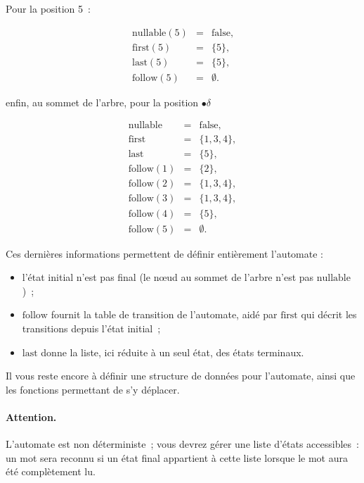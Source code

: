 Pour la position 5~: 

$$\begin{array}{lcl}
\mbox{nullable}(5)&=&\mbox{false},\\
\mbox{first}(5)&=&\{5\},\\
\mbox{last}(5)&=&\{5\},\\
\mbox{follow}(5)&=&\emptyset.
\end{array}
$$


enfin, au sommet de l'arbre, pour la position $\bullet \delta$

$$\begin{array}{lcl}
\mbox{nullable}&=&\mbox{false},\\
\mbox{first}&=&\{1,3,4\},\\
\mbox{last}&=&\{5\},\\
\mbox{follow}(1)&=&\{2\},\\
\mbox{follow}(2)&=&\{1,3,4\},\\
\mbox{follow}(3)&=&\{1,3,4\},\\
\mbox{follow}(4)&=&\{5\},\\
\mbox{follow}(5)&=&\emptyset.
\end{array}
$$


Ces derni{\`e}res informations permettent de d{\'e}finir enti{\`e}rement l'automate : 
\begin{itemize}
\item l'{\'e}tat initial n'est pas final (le n\oe{}ud au sommet de l'arbre n'est pas $\mbox{nullable}$)~;
\item $\mbox{follow}$ fournit la table de transition de l'automate, aid{\'e} par $\mbox{first}$ qui d{\'e}crit les transitions depuis l'{\'e}tat initial~;
\item $\mbox{last}$ donne la liste, ici r{\'e}duite {\`a} un seul {\'e}tat, des {\'e}tats terminaux. 
\end{itemize}
\par\medskip

Il vous reste encore {\`a} d{\'e}finir une structure de donn{\'e}es pour l'automate, ainsi que les fonctions permettant de s'y d{\'e}placer. 
\paragraph{Attention.} L'automate est non d{\'e}terministe~; vous devrez g{\'e}rer une liste d'{\'e}tats accessibles~: un mot sera reconnu si un {\'e}tat final appartient {\`a} cette liste lorsque le mot aura {\'e}t{\'e} compl{\`e}tement lu. 



